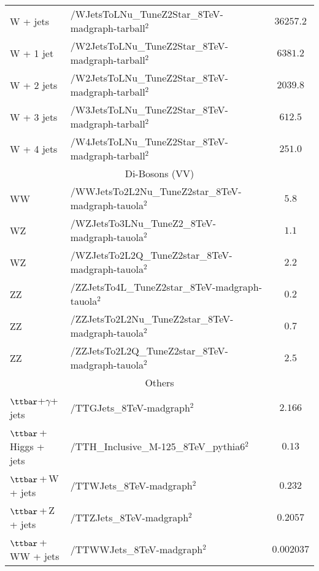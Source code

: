 \begin{table}[!ht]
\begin{center}
{\begin{tabular}{|l|l|c|}
W + jets                           &   /WJetsToLNu\_TuneZ2Star\_8TeV-madgraph-tarball$^{2}$          &  $36257.2$              \\
W + 1 jet                           &   /W2JetsToLNu\_TuneZ2Star\_8TeV-madgraph-tarball$^{2}$         &  $6381.2$               \\
W + 2 jets                          &   /W2JetsToLNu\_TuneZ2Star\_8TeV-madgraph-tarball$^{2}$         &  $2039.8$               \\
W + 3 jets                          &   /W3JetsToLNu\_TuneZ2Star\_8TeV-madgraph-tarball$^{2}$         &  $612.5$               \\
W + 4 jets                          &   /W4JetsToLNu\_TuneZ2Star\_8TeV-madgraph-tarball$^{2}$         &  $251.0$                \\
\hline
\multicolumn{3}{|c|}{Di-Bosons (VV) }\\
\hline
WW                                 &   /WWJetsTo2L2Nu\_TuneZ2star\_8TeV-madgraph-tauola$^{2}$        &  $5.8$                \\
WZ                                 &   /WZJetsTo3LNu\_TuneZ2\_8TeV-madgraph-tauola$^{2}$             &  $1.1$                \\
WZ                                 &   /WZJetsTo2L2Q\_TuneZ2star\_8TeV-madgraph-tauola$^{2}$         &  $2.2$                \\
ZZ                                 &   /ZZJetsTo4L\_TuneZ2star\_8TeV-madgraph-tauola$^{2}$           &  $0.2$                \\
ZZ                                 &   /ZZJetsTo2L2Nu\_TuneZ2star\_8TeV-madgraph-tauola$^{2}$        &  $0.7$                \\
ZZ                                 &   /ZZJetsTo2L2Q\_TuneZ2star\_8TeV-madgraph-tauola$^{2}$         &  $2.5$                \\
\hline
\multicolumn{3}{|c|}{Others }\\
\hline
$\ttbar$+$\gamma$+ jets              &   /TTGJets\_8TeV-madgraph$^{2}$                                  &  $2.166$              \\
$\ttbar$\,+\,Higgs + jets              &   /TTH\_Inclusive\_M-125\_8TeV\_pythia6$^{2}$                    &  $0.13$               \\
$\ttbar$\,+\,W + jets                  &   /TTWJets\_8TeV-madgraph$^{2}$                                  &  $0.232$              \\
$\ttbar$\,+\,Z + jets                  &   /TTZJets\_8TeV-madgraph$^{2}$                                  &  $0.2057$                \\
$\ttbar$\,+\,WW + jets                 &   /TTWWJets\_8TeV-madgraph$^{2}$                                 &  $0.002037$                \\



\end{tabular}}
\end{center}
\end{table}
